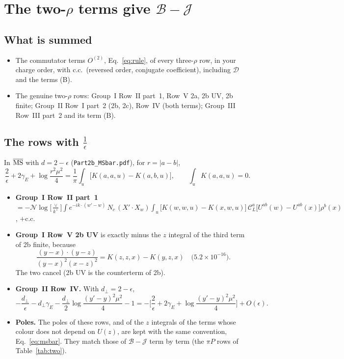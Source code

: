 \documentclass[10pt]{article}
\numberwithin{equation}{section}
\newcommand{\CL}{\mathcal C_L}
\newcommand{\NN}{\mathcal N}
\newcommand{\BB}{\mathcal B}
\newcommand{\JJ}{\mathcal J}
\newcommand{\Lv}{\log\Big[\frac{\vee}{k^+}\Big]}
\newcommand{\phw}{e^{-ik\cdot(w'-w)}}
\begin{document}
\section{The two-\texorpdfstring{$\rho$}{rho} terms give \texorpdfstring{$\mathcal B-\mathcal J$}{B - J}}\label{sec:two}
\subsection{What is summed}
\begin{itemize}
\item The commutator terms $O^{(2)}$, Eq.~\eqref{eq:rule}, of every three-$\rho$ row, in your charge order, with c.c.\ (reversed order, conjugate coefficient), including $\mathcal D$ and the terms (B).
\item The genuine two-$\rho$ rows: Group~I Row~II part~1, Row~V 2a, 2b UV, 2b finite; Group~II Row~I part~2 (2b, 2c), Row~IV (both terms); Group~III Row~III part~2 and its term (B).
\end{itemize}

\subsection{The rows with \texorpdfstring{$\frac1\epsilon$}{1/epsilon}}\label{sec:eps}
In $\overline{\rm MS}$ with $d=2-\epsilon$ (\texttt{Part2b\_MSbar.pdf}), for $r=|a-b|$,
\begin{equation}
\frac2\epsilon+2\gamma_E+\log\frac{r^2\mu^2}{4}=\frac1\pi\int_u\big[K(a,a,u)-K(a,b,u)\big],\qquad \int_uK(a,a,u)=0.
\label{eq:msbar}
\end{equation}
\begin{itemize}
\item \textbf{Group~I Row~II part~1} $=-\NN\Lv\int\phw\,N_c\,(X'\!\cdot X_w)\int_u\big[K(w,w,u)-K(x,w,u)\big]\,\CL^a\big[U^{ab}(w)-U^{ab}(x)\big]\rho^b(x)$, $+$c.c.
\item \textbf{Group~I Row~V 2b UV} is exactly minus the $z$ integral of the third term of 2b finite, because
\begin{equation*}
\frac{(y-x)\cdot(y-z)}{(y-x)^2(x-z)^2}=K(z,z,x)-K(y,z,x)\quad\text{($5.2\times10^{-16}$)}.
\end{equation*}
The two cancel (2b UV is the counterterm of 2b).
\item \textbf{Group~II Row~IV.} With $d_\perp=2-\epsilon$,
\begin{equation*}
-\frac{d_\perp}{\epsilon}-d_\perp\gamma_E-\frac{d_\perp}{2}\log\frac{(y'-y)^2\mu^2}{4}-1=-\Big[\frac2\epsilon+2\gamma_E+\log\frac{(y'-y)^2\mu^2}{4}\Big]+O(\epsilon).
\end{equation*}
\item \textbf{Poles.} The poles of these rows, and of the $z$ integrals of the terms whose colour does not depend on $U(z)$, are kept with the same convention, Eq.~\eqref{eq:msbar}. They match those of $\BB-\JJ$ term by term (the $\pi P$ rows of Table~\ref{tab:two}).
\end{itemize}
\end{document}
